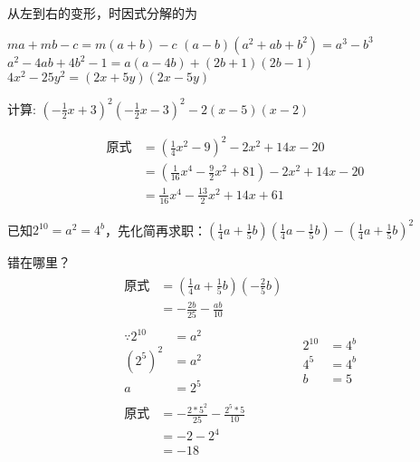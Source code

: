 \documentclass[answers]{exam} %
\begin{document}
\begin{questions}
\question
  从左到右的变形，时因式分解的为
  \begin{choices}
    \choice $ma+mb-c=m(a+b)-c$
    \choice $(a-b)(a^2+ab+b^2)=a^3-b^3$
    \choice $a^2-4ab+4b^2-1=a(a-4b)+(2b+1)(2b-1)$
    \choice $4x^2-25y^2=(2x+5y)(2x-5y)$
  \end{choices}

\question
  计算: $(-\frac{1}{2}x + 3)^2(-\frac{1}{2}x-3)^2-2(x-5)(x-2)$

  \vspace*{1in}
  \begin{solution}
    \[
      \begin{aligned}
        \mbox{原式} &= (\frac{1}{4}x^2 - 9)^2 - 2x^2 + 14x - 20 \\
        &= (\frac{1}{16}x^4 - \frac{9}{2}x^2 + 81) - 2x^2 + 14x - 20 \\
        &= \frac{1}{16}x^4 - \frac{13}{2}x^2 + 14x + 61
      \end{aligned}
    \]
  \end{solution}

\question
  已知$2^{10}=a^2=4^b$，先化简再求职：$(\frac{1}{4}a +
  \frac{1}{5}b)(\frac{1}{4}a-\frac{1}{5}b)-(\frac{1}{4}a+\frac{1}{5}b)^2$

  \vspace*{1in}
  \begin{solution}
    错在哪里？
    \[
      \begin{aligned}
        & \begin{aligned}
          \mbox{原式} &= (\frac{1}{4}a + \frac{1}{5}b)(-\frac{2}{5}b) \\
          &= - \frac{2b}{25} - \frac{ab}{10}
        \end{aligned} \\
        & \begin{aligned}
          \because  2^{10} &= a ^2 \\
          (2^5)^2 &= a^2 \\
          a &= 2^5
        \end{aligned}
        & \begin{aligned}
          2^{10} &= 4^b \\
          4^5 &= 4^{b} \\
          b &= 5
        \end{aligned} \\
        & \begin{aligned}
          \mbox{原式} &= - \frac{2*5^2}{25} - \frac{2^5*5}{10} \\
          &= -2 - 2^4 \\
          &= -18
        \end{aligned}
      \end{aligned}
    \]
  \end{solution}


\end{questions}
\end{document}
